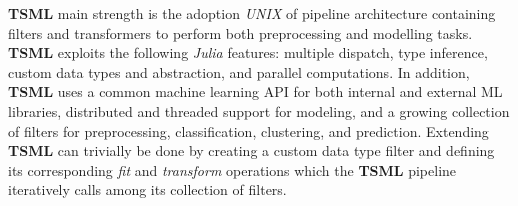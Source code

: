 \documentclass{juliacon}
\begin{document}
\vskip 6pt

\textbf{TSML} main strength is the adoption \emph{UNIX} of pipeline architecture containing filters and transformers to perform both preprocessing and modelling tasks. \textbf{TSML}  exploits the following \emph{Julia} features: multiple dispatch, type inference, custom data types and abstraction, and parallel computations.  In addition, \textbf{TSML} uses a common machine learning API for both internal and external ML libraries, distributed and threaded support for modeling, and a growing collection of filters for preprocessing, classification, clustering, and prediction. Extending \textbf{TSML} can trivially be done by creating a custom data type filter and defining its corresponding \emph{fit} and \emph{transform} operations which the \textbf{TSML} pipeline iteratively calls among its collection of filters.



\end{document}
